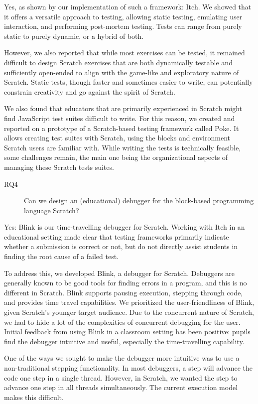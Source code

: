 \documentclass[main]{subfiles}
\begin{document}
Yes, as shown by our implementation of such a framework: Itch.
We showed that it offers a versatile approach to testing, allowing static testing, emulating user interaction, and performing post-mortem testing.
Tests can range from purely static to purely dynamic, or a hybrid of both.

However, we also reported that while most exercises can be tested, it remained difficult to design Scratch exercises that are both dynamically testable and sufficiently open-ended to align with the game-like and exploratory nature of Scratch.
Static tests, though faster and sometimes easier to write, can potentially constrain creativity and go against the spirit of Scratch.

We also found that educators that are primarily experienced in Scratch might find JavaScript test suites difficult to write.
For this reason, we created and reported on a prototype of a Scratch-based testing framework called Poke.
It allows creating test suites with Scratch, using the blocks and environment Scratch users are familiar with.
While writing the tests is technically feasible, some challenges remain, the main one being the organizational aspects of managing these Scratch tests suites.

\begin{description}
    \item[RQ4] Can we design an (educational) debugger for the block-based programming language Scratch?
\end{description}

Yes: Blink is our time-travelling debugger for Scratch.
Working with Itch in an educational setting made clear that testing frameworks primarily indicate whether a submission is correct or not, but do not directly assist students in finding the root cause of a failed test.

To address this, we developed Blink, a debugger for Scratch.
Debuggers are generally known to be good tools for finding errors in a program, and this is no different in Scratch.
Blink supports pausing execution, stepping through code, and provides time travel capabilities.
We prioritized the user-friendliness of Blink, given Scratch's younger target audience.
Due to the concurrent nature of Scratch, we had to hide a lot of the complexities of concurrent debugging for the user.
Initial feedback from using Blink in a classroom setting has been positive: pupils find the debugger intuitive and useful, especially the time-travelling capability.

One of the ways we sought to make the debugger more intuitive was to use a non-traditional stepping functionality.
In most debuggers, a step will advance the code one step in a single thread.
However, in Scratch, we wanted the step to advance one step in all threads simultaneously.
The current execution model makes this difficult.
\end{document}
